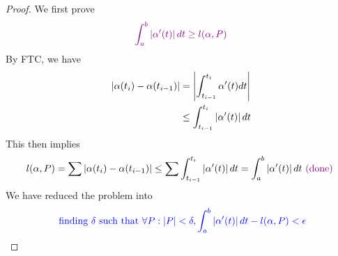 \documentclass{report}
\begin{document}
\begin{proof}
We first prove 
\begin{align*}
\textcolor{violet}{\int_a^b \left|\alpha '(t)\right|dt \geq  l(\alpha ,P)}
\end{align*}
By FTC, we have
\begin{align*}
  \left|\alpha (t_i)-\alpha (t_{i-1})\right|&=\left|\int_{t_{i-1}}^{t_i} \alpha '(t)dt\right|\\
&\leq \int_{t_{i-1}}^{t_i} \left|\alpha '(t)\right|dt 
\end{align*}
This then implies 
\begin{align*}
l(\alpha ,P)=\sum \left|\alpha (t_i)-\alpha (t_{i-1})\right|\leq \sum \int_{t_{i-1}}^{t_i}\left|\alpha '(t)\right|dt=\int_a^b \left|\alpha '(t)\right|dt \textcolor{violet}{\text{ (done) }}
\end{align*}
We have reduced the problem into 
\begin{align*}
\textcolor{blue}{\text{ finding $\delta$ such that }\forall P: \left|P\right|<\delta , \int_a^b \left|\alpha '(t)\right|dt - l(\alpha ,P)<\epsilon }
\end{align*}



\end{proof}
\end{document}
